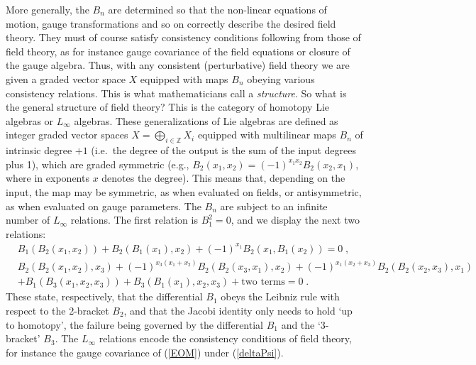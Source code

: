 \documentclass[12pt]{article}\pdfoutput=1
\def\be{\begin{equation}}
\def\ee{\end{equation}}
\begin{document}
More generally, the $B_n$ are determined so that the non-linear equations of motion, gauge transformations and so on 
correctly describe the desired field theory. They must of course satisfy consistency conditions following 
from those of field theory, as for instance gauge covariance of the field equations or closure of the gauge algebra. 
Thus, with any consistent (perturbative) 
field theory we are given   a graded vector space $X$ equipped with 
maps  $B_n$  obeying various consistency relations. This is what mathematicians call a \textit{structure}. 
So what is the general structure of  field theory? This is the category of homotopy Lie algebras 
or  $L_{\infty}$ algebras.   
These generalizations of Lie algebras  are defined as integer graded vector spaces $X=\bigoplus_{i\in \mathbb{Z}}X_i$ equipped with 
multilinear maps $B_n$ of intrinsic degree $+1$ 
(i.e.~the degree of the output is the sum of the input degrees plus 1), which are graded symmetric (e.g., 
$B_2(x_1, x_2) = (-1)^{x_1x_2} B_2(x_2,x_1)$, where in exponents $x$ denotes the degree). 
This means that, depending on the input, the map may be symmetric, as when evaluated on fields, or antisymmetric, 
as when evaluated on gauge parameters. 
The $B_n$ are subject to an infinite number of
 $L_{\infty}$ relations. The first relation is $B_1^2=0$, 
 and we display  the next two relations: 
 \be\label{LinftyREL} 
  \begin{split}
   &B_1(B_2(x_1,x_2)) + B_2(B_1(x_1), x_2) + (-1)^{x_1} B_2(x_1, B_1(x_2))=0  \;, \\[0.8ex] 
   &B_2(B_2(x_1,x_2),x_3) + 
   (-1)^{x_3(x_1+x_2)} B_2(B_2(x_3,x_1),x_2)
   +(-1)^{x_1(x_2+x_3)}  B_2(B_2(x_2,x_3),x_1)  \\
   &+ B_1(B_3(x_1,x_2,x_3)) + B_3(B_1(x_1),x_2,x_3) + \text{two terms} = 0 \;. 
  \end{split}
 \ee   
These state, respectively,  that the differential $B_{1}$ obeys the Leibniz rule with respect to the  2-bracket $B_2$, 
and that the Jacobi identity only needs to hold  `up to homotopy', the failure being governed by the differential $B_1$
and the `3-bracket' $B_3$. The  $L_{\infty}$ relations encode the consistency 
conditions of field theory, for instance the gauge covariance of (\ref{EOM}) under (\ref{deltaPsi}).
\end{document}

